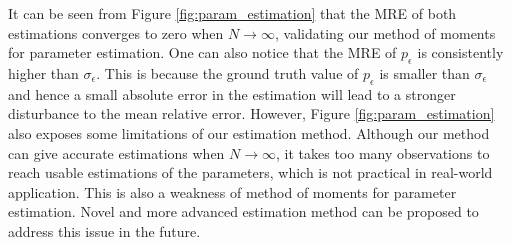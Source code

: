 It can be seen from Figure \ref{fig:param_estimation} that the MRE of both estimations converges to zero when $N\to\infty$, validating our method of moments for parameter estimation. One can also notice that the MRE of $p_\epsilon$ is consistently higher than $\sigma_\epsilon$. This is because the ground truth value of $p_\epsilon$ is smaller than $\sigma_\epsilon$ and hence a small absolute error in the estimation will lead to a stronger disturbance to the mean relative error. However, Figure \ref{fig:param_estimation} also exposes some limitations of our estimation method. Although our method can give accurate estimations when $N\to\infty$, it takes too many observations to reach usable estimations of the parameters, which is not practical in real-world application. This is also a weakness of method of moments for parameter estimation. Novel and more advanced estimation method can be proposed to address this issue in the future.